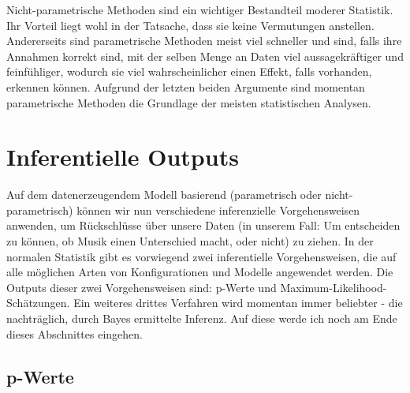 \documentclass[a4paper,twoside]{tufte-book}\usepackage[]{graphicx}\usepackage[]{color}
\begin{document}
Nicht-parametrische Methoden sind ein wichtiger Bestandteil moderer Statistik. Ihr Vorteil liegt wohl in der Tatsache, dass sie keine Vermutungen anstellen. Andererseits sind parametrische Methoden meist viel schneller und sind, falls ihre Annahmen korrekt sind, mit der selben Menge an Daten viel aussagekräftiger und feinfühliger, wodurch sie viel wahrscheinlicher einen Effekt, falls vorhanden, erkennen können. Aufgrund der letzten beiden Argumente sind momentan parametrische Methoden die Grundlage der meisten statistischen Analysen.


\section{Inferentielle Outputs}

Auf dem datenerzeugendem Modell basierend (parametrisch oder nicht-parametrisch) können wir nun verschiedene inferenzielle Vorgehensweisen anwenden, um Rückschlüsse über unsere Daten (in unserem Fall: Um entscheiden zu können, ob Musik einen Unterschied macht, oder nicht) zu ziehen. In der normalen Statistik gibt es vorwiegend zwei inferentielle Vorgehensweisen, die auf alle möglichen Arten von Konfigurationen und Modelle angewendet werden. Die Outputs dieser zwei Vorgehensweisen sind: p-Werte und Maximum-Likelihood-Schätzungen. Ein weiteres drittes Verfahren wird momentan immer beliebter - die nachträglich, durch Bayes ermittelte Inferenz. Auf diese werde ich noch am Ende dieses Abschnittes eingehen.

\subsection{p-Werte}
\end{document}
